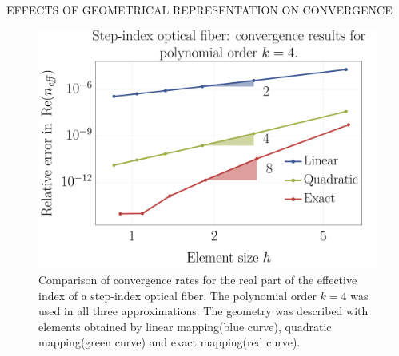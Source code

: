 \documentclass[debug]{beamer} %
\begin{document}
\begin{frame}
\begin{minipage}[t]{0.45\textwidth}
\begin{block}{\boxnumber EFFECTS OF GEOMETRICAL REPRESENTATION ON CONVERGENCE}
        	\begin{figure}[ht]
	            \centering
	            \includegraphics[width=0.7\linewidth]{images/convergenceRates_k4_poster.png}
	            \caption{Comparison of convergence rates for the real part of the effective index of a step-index optical fiber. The polynomial order $k=4$ was used in all three approximations. The geometry was described with elements obtained by linear mapping(blue curve), quadratic mapping(green curve) and exact mapping(red curve).}
	            \label{fig:convergence-step}
        	\end{figure}
        

\end{block}
\end{minipage}
\end{frame}
\end{document}
